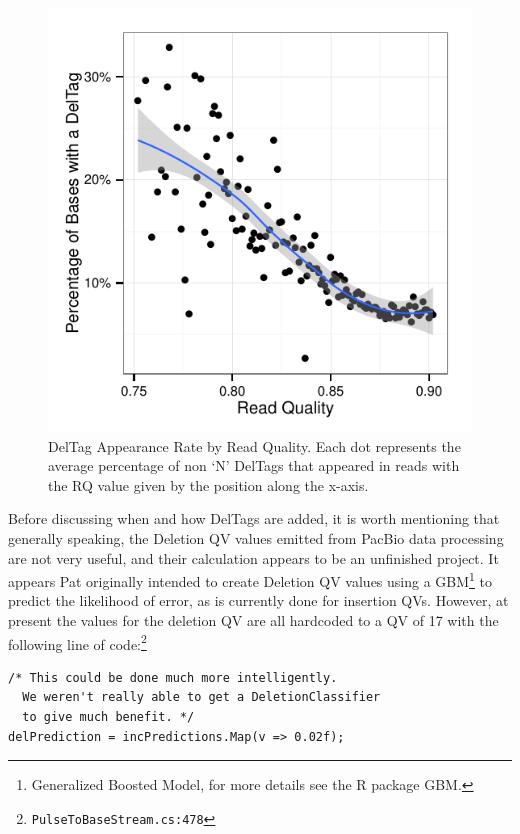 \documentclass[fleqn,10pt]{SelfArx} %
\begin{document}
\begin{figure}[ht]\centering 
\includegraphics[width=\linewidth]{TagRateByRQ}
\caption{DelTag Appearance Rate by Read Quality.  Each dot represents the average percentage of non `N' DelTags that appeared in reads with the RQ value given by the position along the x-axis. }
\label{fig:RateByRQ}
\end{figure}


Before discussing when and how DelTags are added, it is worth mentioning that generally speaking, the Deletion QV values emitted from PacBio data processing are not very useful, and their calculation appears to be an unfinished project.  It appears Pat originally intended to create Deletion QV values using a GBM\footnote{Generalized Boosted Model, for more details see the R package GBM.} to predict the likelihood of error, as is currently done for insertion QVs.  However, at present the values for the deletion QV are all hardcoded to a QV of 17 with the following line of code:\footnote{\texttt{PulseToBaseStream.cs:478}}

\lstset{style=sharpc}
\begin{lstlisting}[frame=single]
/* This could be done much more intelligently.
  We weren't really able to get a DeletionClassifier
  to give much benefit. */
delPrediction = incPredictions.Map(v => 0.02f);
\end{lstlisting}
\end{document}
